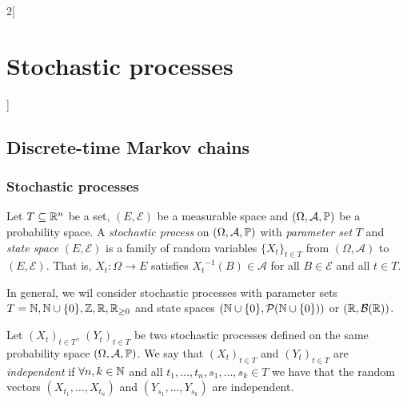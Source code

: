 \documentclass[../../../main_math.tex]{subfiles}
\begin{document}
\begin{multicols}{2}[\section{Stochastic processes}]
  \subsection{Discrete-time Markov chains}
  \subsubsection{Stochastic processes}
  \begin{definition}
    Let $T\subseteq \mathbb{R}^n$ be a set, $(E,\mathcal{E})$ be a measurable space and $(\Omega,\mathcal{A},\mathbb{P})$ be a probability space. A \emph{stochastic process} on $(\Omega,\mathcal{A},\mathbb{P})$ with \emph{parameter set} $T$ and \emph{state space} $(E,\mathcal{E})$ is a family of random variables ${\{X_t\}}_{t\in T}$ from $(\Omega,\mathcal{A})$ to $(E,\mathcal{E})$. That is, $X_t:\Omega\to E$ satisfies ${X_t}^{-1}(B)\in\mathcal{A}$ for all $B\in\mathcal{E}$ and all $t\in T$.
  \end{definition}
  \begin{remark}
    In general, we wil consider stochastic processes with parameter sets $T=\mathbb{N},\mathbb{N}\cup\{0\},\mathbb{Z},\mathbb{R},\mathbb{R}_{\geq 0}$ and state spaces $(\mathbb{N}\cup\{0\},\mathcal{P}(\mathbb{N} \cup \{0\}))$ or $(\mathbb{R},\mathcal{B}(\mathbb{R}))$.
  \end{remark}
  \begin{definition}
    Let ${(X_t)}_{t\in T}$, ${(Y_t)}_{t\in T}$ be two stochastic processes defined on the same probability space $(\Omega,\mathcal{A},\mathbb{P})$. We say that ${(X_t)}_{t\in T}$ and ${(Y_t)}_{t\in T}$ are \emph{independent} if $\forall n,k\in\mathbb{N}$ and all $t_1,\ldots,t_n,s_1,\ldots,s_k\in T$ we have that the random vectors $(X_{t_1},\ldots,X_{t_n})$ and $(Y_{s_1},\ldots,Y_{s_k})$ are independent.
  \end{definition}

\end{multicols}
\end{document}
